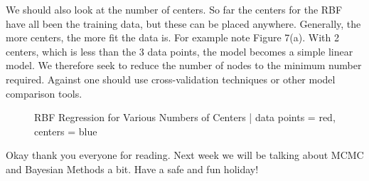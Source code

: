 \documentclass[12pt]{article}
\begin{document}
\vspace{5mm}

We should also look at the number of centers. So far the centers for the RBF have all been the training data, but these can be placed anywhere. Generally, the more centers, the more fit the data is. For example note Figure 7(a). With 2 centers, which is less than the 3 data points, the model becomes a simple linear model. We therefore seek to reduce the number of nodes to the minimum number required. Against one should use cross-validation techniques or other model comparison tools.

\begin{figure}[h]
\centering
{}
\caption{RBF Regression for Various Numbers of Centers | data points = red, centers = blue}
\end{figure}

\vspace{5mm}

Okay thank you everyone for reading. Next week we will be talking about MCMC and Bayesian Methods a bit. Have a safe and fun holiday!
\end{document}
